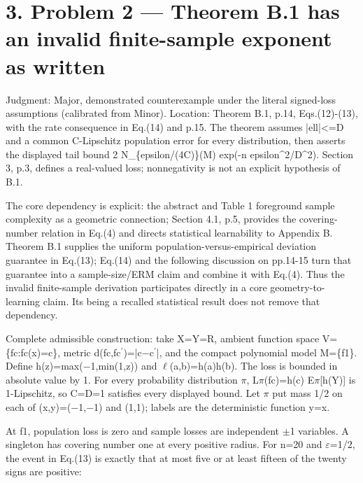 \documentclass[10pt]{article}
\begin{document}
\section*{3. Problem 2 — Theorem B.1 has an invalid finite-sample exponent as written}
Judgment: Major, demonstrated counterexample under the literal signed-loss assumptions (calibrated from Minor). Location: Theorem B.1, p.14, Eqs.(12)-(13), with the rate consequence in Eq.(14) and p.15. The theorem assumes |ell|<=D and a common C-Lipschitz population error for every distribution, then asserts the displayed tail bound 2 N\_\{epsilon/(4C)\}(M) exp(-n epsilon\textasciicircum{}2/D\textasciicircum{}2). Section 3, p.3, defines a real-valued loss; nonnegativity is not an explicit hypothesis of B.1.\par
The core dependency is explicit: the abstract and Table 1 foreground sample complexity as a geometric connection; Section 4.1, p.5, provides the covering-number relation in Eq.(4) and directs statistical learnability to Appendix B. Theorem B.1 supplies the uniform population-versus-empirical deviation guarantee in Eq.(13); Eq.(14) and the following discussion on pp.14-15 turn that guarantee into a sample-size/ERM claim and combine it with Eq.(4). Thus the invalid finite-sample derivation participates directly in a core geometry-to-learning claim. Its being a recalled statistical result does not remove that dependency.\par
Complete admissible construction: take X=Y=R, ambient function space V=\{fc:fc(x)=c\}, metric d(fc,fc\(^{\prime}\))=|c\(-\)c\(^{\prime}\)|, and the compact polynomial model M=\{f1\}. Define h(z)=max(\(-\)1,min(1,z)) and \(\ell\)(a,b)=h(a)h(b). The loss is bounded in absolute value by 1. For every probability distribution \(\pi\), L\(\pi\)(fc)=h(c) E\(\pi\)[h(Y)] is 1-Lipschitz, so C=D=1 satisfies every displayed bound. Let \(\pi\) put mass 1/2 on each of (x,y)=(\(-\)1,\(-\)1) and (1,1); labels are the deterministic function y=x.\par
At f1, population loss is zero and sample losses are independent \(\pm\)1 variables. A singleton has covering number one at every positive radius. For n=20 and \(\varepsilon\)=1/2, the event in Eq.(13) is exactly that at most five or at least fifteen of the twenty signs are positive:\par
\end{document}
